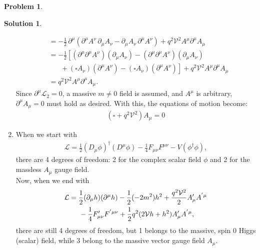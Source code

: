 \documentclass{book}
\numberwithin{equation}{section}
\theoremstyle{definition}
\newtheorem{prob}{Problem}[section]
\newtheorem{sln}{Solution}[section]
\newcommand{\p}{\partial}
\newcommand{\lag}{\mathcal{L}}
\newcommand{\V}{\mathcal{V}}
\begin{document}
\begin{prob}
\begin{sln}
\begin{enumerate}
\begin{align}
				&= -\frac{1}{2}\,\p^\mu\left(\partial^\mu A^\nu\,\partial_\mu A_\nu - \partial_\mu A_\nu\,\partial^\mu A^\nu \right) + q^2\V^2A^\mu\p^\mu A_\mu\nonumber\\
				&= -\frac{1}{2}\left[(\p^\mu\p^\mu A^\nu)(\p_\mu A_\nu) - (\p^\mu\p^\mu A^\nu)(\p_\mu A_\nu)\right.\nonumber\\
				&\left.\,\,\,\,\,\,\,\,\,\, + (\square A_\nu)( \p^\mu A^\nu) - (\square A_\nu)( \p^\mu A^\nu)   \right] + 
				q^2\V^2A^\mu\p^\mu A_\mu\nonumber\\
				&= q^2\V^2 A^\mu\p^\mu A_\mu.
				\end{align}
				Since $\p^\mu\lag_2 = 0$, a massive $m\neq 0$ field is assumed, and $A^\mu$ is arbitrary, $\p^\mu A_\mu = 0$ must hold as desired. With this, the equations of motion become:
				\begin{align}
				\boxed{\left(\square +  q^2\V^2\right) A_\mu = 0}
				\end{align}
				
				
				
				
				
				\item When we start with 
				\begin{align}
				\lag = \frac{1}{2}(D_\mu\phi)^\dagger(D^\mu\phi) - \frac{1}{4}F_{\mu\nu}F^{\mu\nu} - V(\phi^\dagger\phi),
				\end{align}
				there are 4 degrees of freedom: 2 for the complex scalar field $\phi$ and 2 for the massless $A_\mu$ gauge field. \\
				
				Now, when we end with 
				\begin{align}
				\lag &= \frac{1}{2}(\p_\mu h)(\p^\mu h) - \frac{1}{2}(-2m^2)h^2 + \frac{q^2\V^2}{2}A'_\mu A^{'\mu}\nonumber\\ 
				&\hspace{0.5cm} - \frac{1}{4}F'_{\mu\nu}F^{'\mu\nu} + \frac{1}{2}q^2(2\V h + h^2)A'_\mu A^{'\mu},
				\end{align}
				there are still 4 degrees of freedom, but 1 belongs to the massive, spin 0 Higgs (scalar) field, while 3 belong to the massive vector gauge field $A_\mu$.\\
				
				
			\end{enumerate}
		\end{sln}

	
	
	
	
\end{prob}
\end{document}
